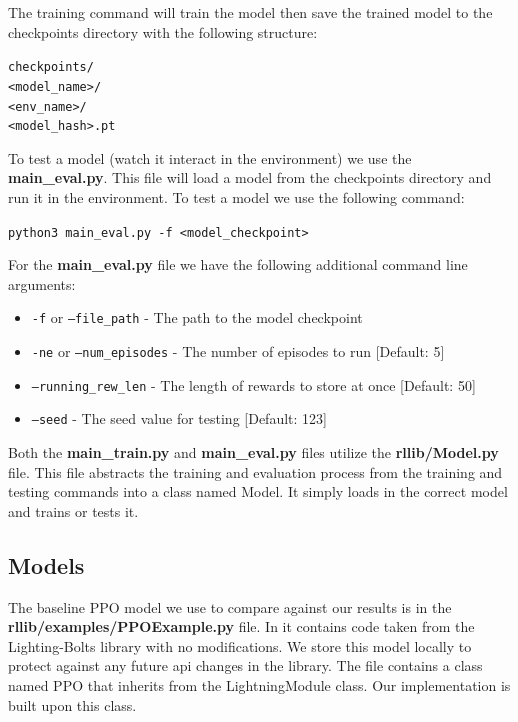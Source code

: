 The training command will train the model then save the trained model to the checkpoints directory with the following structure:
\begin{center}
    \texttt{checkpoints/\\<model\_name>/\\<env\_name>/\\<model\_hash>.pt}
\end{center}

To test a model (watch it interact in the environment) we use the \textbf{main\_eval.py}. This file will load a model from the checkpoints directory and
run it in the environment.
To test a model we use the following command:
\begin{center}
    \texttt{python3 main\_eval.py -f <model\_checkpoint>}
\end{center}

For the \textbf{main\_eval.py} file we have the following additional command line arguments:
\begin{itemize}
    \item \texttt{-f} or \texttt{--file\_path} - The path to the model checkpoint
    \item \texttt{-ne} or \texttt{--num\_episodes} - The number of episodes to run [Default: 5]
    \item \texttt{--running\_rew\_len} - The length of rewards to store at once [Default: 50]
    \item \texttt{--seed} - The seed value for testing [Default: 123]
\end{itemize}

Both the \textbf{main\_train.py} and \textbf{main\_eval.py} files utilize the \textbf{rllib/Model.py} file.
This file abstracts the training and evaluation process from the training and testing commands into a class named Model.
It simply loads in the correct model and trains or tests it.

\subsection{Models}

The baseline PPO model we use to compare against our results is in the \textbf{rllib/examples/PPOExample.py} file.
In it contains code taken from the Lighting-Bolts library with no modifications. We store this model locally to protect against
any future api changes in the library. The file contains a class named PPO that inherits from the LightningModule class.
Our implementation is built upon this class.

